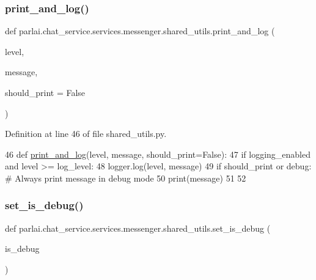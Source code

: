 \subsubsection{\texorpdfstring{print\+\_\+and\+\_\+log()}{print\_and\_log()}}
{\footnotesize\ttfamily def parlai.\+chat\+\_\+service.\+services.\+messenger.\+shared\+\_\+utils.\+print\+\_\+and\+\_\+log (\begin{DoxyParamCaption}\item[{}]{level,  }\item[{}]{message,  }\item[{}]{should\+\_\+print = {\ttfamily False} }\end{DoxyParamCaption})}



Definition at line 46 of file shared\+\_\+utils.\+py.


\begin{DoxyCode}
46 \textcolor{keyword}{def }\hyperlink{namespaceparlai_1_1mturk_1_1core_1_1shared__utils_a9ffb0cdb3846323e276281cbeb16979a}{print\_and\_log}(level, message, should\_print=False):
47     \textcolor{keywordflow}{if} logging\_enabled \textcolor{keywordflow}{and} level >= log\_level:
48         logger.log(level, message)
49     \textcolor{keywordflow}{if} should\_print \textcolor{keywordflow}{or} debug:  \textcolor{comment}{# Always print message in debug mode}
50         print(message)
51 
52 
\end{DoxyCode}
\mbox{\label{namespaceparlai_1_1chat__service_1_1services_1_1messenger_1_1shared__utils_a9b1d6bb954152c2fbcca802ab4e60c0a}} 
\subsubsection{\texorpdfstring{set\+\_\+is\+\_\+debug()}{set\_is\_debug()}}
{\footnotesize\ttfamily def parlai.\+chat\+\_\+service.\+services.\+messenger.\+shared\+\_\+utils.\+set\+\_\+is\+\_\+debug (\begin{DoxyParamCaption}\item[{}]{is\+\_\+debug }\end{DoxyParamCaption})}



